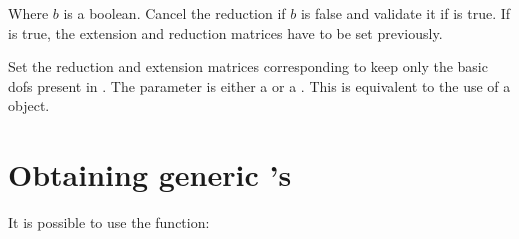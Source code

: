 \documentclass[a4paper,11pt,english]{sphinxmanual}
\begin{document}

\begin{fulllineitems}
\label{\detokenize{userdoc/bfem:_CPPv4N6getfem8mesh_fem13set_reductionE1b}}%
\pysigstartmultiline
{}%
\pysigstopmultiline
Where \(b\) is a boolean. Cancel the reduction if \(b\) is false and
validate it if  is true. If  is true, the extension and reduction
matrices have to be set previously.

\end{fulllineitems}


\begin{fulllineitems}
\label{\detokenize{userdoc/bfem:_CPPv4N6getfem8mesh_fem19reduce_to_basic_dofE4idof}}%
\pysigstartmultiline
{}%
\pysigstopmultiline
Set the reduction and extension matrices corresponding to keep only the basic
dofs present in . The parameter  is either a  or a
. This is equivalent to the use of a
 object.

\end{fulllineitems}



\section{Obtaining generic ’s}
\label{\detokenize{userdoc/bfem:obtaining-generic-mf-s}}
It is possible to use the function:

\begin{sphinxVerbatim}[commandchars=\\\{\}]
      
\end{sphinxVerbatim}
\end{document}
